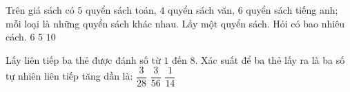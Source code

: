 \begin{ex}%
	Trên giá sách có $5$ quyển sách toán, $4$ quyển sách văn, $6$ quyển sách tiếng anh; mỗi loại là những quyển sách khác nhau. Lấy một quyển sách. Hỏi có bao nhiêu cách.
	\choice
	{$6$}
	{$5$}
	{}
	{$10$}
\end{ex}
\begin{ex}%
	Lấy liên tiếp ba thẻ được đánh số từ $1$ đến $8$. Xác suất để ba thẻ lấy ra là ba số tự nhiên liên tiếp tăng dần là: 
	\choice
	{}
	{$\dfrac{3}{28}$}
	{$\dfrac{3}{56}$}
	{$\dfrac{1}{14}$}
\end{ex}
